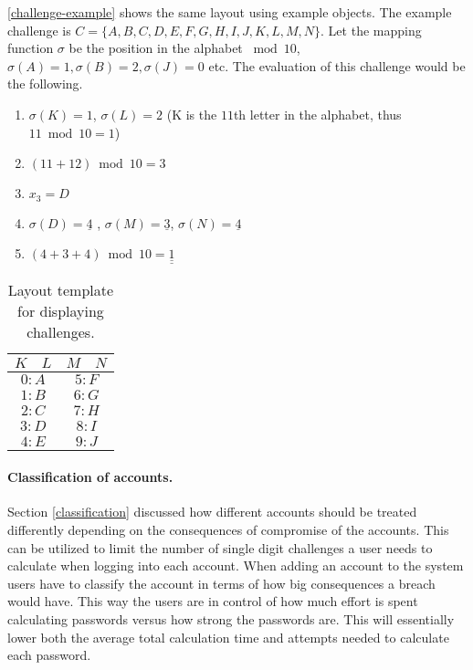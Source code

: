 \begin{example}
    \autoref{challenge-example} shows the same layout using example objects. The example challenge is $C = \{A, B, C, D, E, F, G, H, I, J, K, L, M, N\}$. Let the mapping function $\sigma$ be the position in the alphabet $\bmod 10$, $\sigma(A)=1, \sigma(B)=2, \sigma(J)=0$ etc. The evaluation of this challenge would be the following.
    \begin{enumerate}
        \item $\sigma(K) = 1$, $\sigma(L)=2$ (K is the $11$th letter in the alphabet, thus $11 \bmod 10 = 1$)
        \item $(11 + 12) \bmod 10 = 3$
        \item $x_3 = D$
        \item $\sigma(D) = \underline{4}$ , $\sigma(M)=\underline{3}$, $\sigma(N)=\underline{4}$
        \item $(4 + 3 + 4) \bmod 10 = \underline{\underline{1}}$

    \end{enumerate}

    
    \begin{table}[h]
        \centering
        \begin{tabular}{|c c|c|c|}
            \hline
            $K$ & $L$ & $M$ & $N$ \\
            \hline \hline
            \multicolumn{2}{|c|}{$0:A$} & \multicolumn{2}{|c|}{$5:F$}\\
            \multicolumn{2}{|c|}{$1:B$} & \multicolumn{2}{|c|}{$6:G$}\\
            \multicolumn{2}{|c|}{$2:C$} & \multicolumn{2}{|c|}{$7:H$}\\
            \multicolumn{2}{|c|}{$3:D$} & \multicolumn{2}{|c|}{$8:I$}\\
            \multicolumn{2}{|c|}{$4:E$} & \multicolumn{2}{|c|}{$9:J$}\\
            \hline 
        \end{tabular}
        \caption{Layout template for displaying challenges.}
        \label{challenge-example}
    \end{table}


\end{example}

\paragraph{Classification of accounts.}
Section \ref{classification} discussed how different accounts should be treated differently depending on the consequences of compromise of the accounts. This can be utilized to limit the number of single digit challenges a user needs to calculate when logging into each account. When adding an account to the system users have to classify the account in terms of how big consequences a breach would have. This way the users are in control of how much effort is spent calculating passwords versus how strong the passwords are. This will essentially lower both the average total calculation time and attempts needed to calculate each password. 

